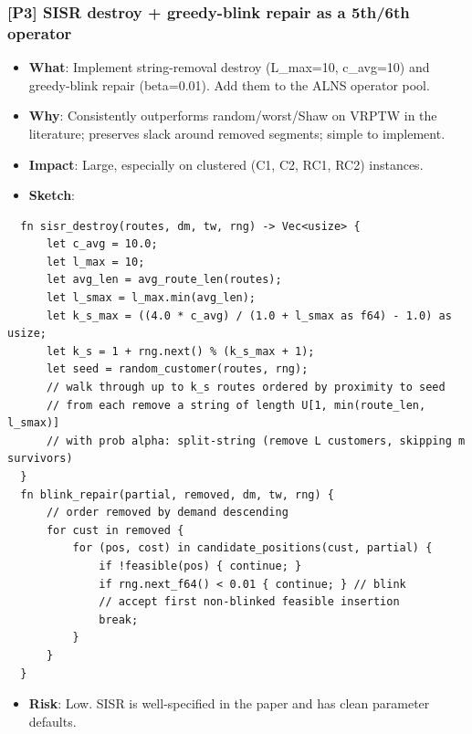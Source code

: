 \documentclass[twocolumn,10pt,letterpaper]{article}
\begin{document}
\subsubsection{[P3] SISR destroy + greedy-blink repair as a 5th/6th operator}
\begin{itemize}
\setlength{\itemsep}{0pt}
\setlength{\parskip}{0pt}
  \item \textbf{What}: Implement string-removal destroy (L\_max=10, c\_avg=10) and greedy-blink repair (beta=0.01). Add them to the ALNS operator pool.
  \item \textbf{Why}: Consistently outperforms random/worst/Shaw on VRPTW in the literature; preserves slack around removed segments; simple to implement.
  \item \textbf{Impact}: Large, especially on clustered (C1, C2, RC1, RC2) instances.
  \item \textbf{Sketch}:
\end{itemize}
\begin{lstlisting}
  fn sisr_destroy(routes, dm, tw, rng) -> Vec<usize> {
      let c_avg = 10.0;
      let l_max = 10;
      let avg_len = avg_route_len(routes);
      let l_smax = l_max.min(avg_len);
      let k_s_max = ((4.0 * c_avg) / (1.0 + l_smax as f64) - 1.0) as usize;
      let k_s = 1 + rng.next() % (k_s_max + 1);
      let seed = random_customer(routes, rng);
      // walk through up to k_s routes ordered by proximity to seed
      // from each remove a string of length U[1, min(route_len, l_smax)]
      // with prob alpha: split-string (remove L customers, skipping m survivors)
  }
  fn blink_repair(partial, removed, dm, tw, rng) {
      // order removed by demand descending
      for cust in removed {
          for (pos, cost) in candidate_positions(cust, partial) {
              if !feasible(pos) { continue; }
              if rng.next_f64() < 0.01 { continue; } // blink
              // accept first non-blinked feasible insertion
              break;
          }
      }
  }
\end{lstlisting}
\begin{itemize}
\setlength{\itemsep}{0pt}
\setlength{\parskip}{0pt}
  \item \textbf{Risk}: Low. SISR is well-specified in the paper and has clean parameter defaults.
\end{itemize}
\end{document}
